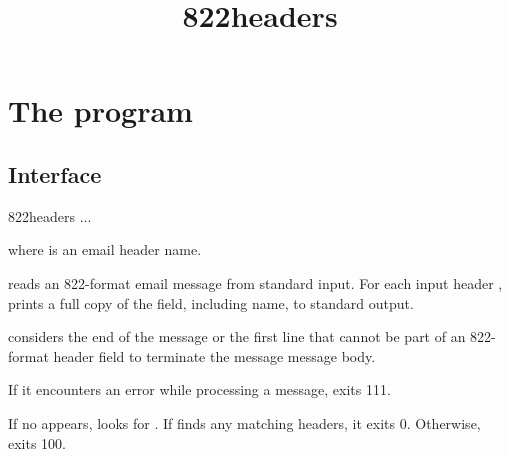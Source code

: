 \documentclass{book}
\title{822headers}
\begin{document}
\section{The  program}

\subsection{Interface}
\begin{code}%
  822headers  ...
\end{code}
where  is an email header name.

 reads an 822-format email message from standard input.
For each input header ,  prints a
full copy of the field, including name, to standard output.

 considers the end of the message or the first line that
cannot be part of an 822-format header field to terminate the message
message body.

If it encounters an error while processing a message,
 exits 111.

If no  appears,  looks for .
If  finds any matching headers, it exits 0.
Otherwise,  exits 100.
\end{document}
